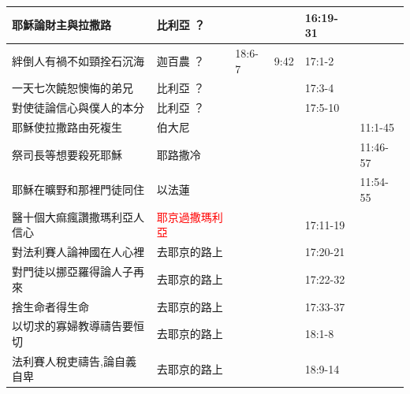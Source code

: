 \begin{table}[H]
\begin{tabular}{p{14em}|p{7.93em}|l|l|l|p{4.855em}}
耶穌論財主與拉撒路 & 比利亞 ？  &       &       & \multicolumn{1}{p{5.285em}|}{16:19-31} & \multicolumn{1}{l}{} \\ \midrule
絆倒人有禍不如頸拴石沉海& 迦百農 ？  &  \multicolumn{1}{p{5.285em}|}{18:6-7} & \multicolumn{1}{p{5.57em}|}{9:42}  & \multicolumn{1}{p{5.285em}|}{17:1-2} & \multicolumn{1}{l}{} \\\midrule

一天七次饒恕懊悔的弟兄& 比利亞 ？  &       &       & \multicolumn{1}{p{5.285em}|}{17:3-4} & \multicolumn{1}{l}{} \\\midrule

對使徒論信心與僕人的本分 & 比利亞 ？  &       &       & \multicolumn{1}{p{5.285em}|}{17:5-10} & \multicolumn{1}{l}{} \\\midrule

耶穌使拉撒路由死複生 & 伯大尼   &       &       &       & 11:1-45\\\midrule

祭司長等想要殺死耶穌& 耶路撒冷  &       &       &       & 11:46-57 \\\midrule
耶穌在曠野和那裡門徒同住&以法蓮&       &       &       & 11:54-55\\\midrule
醫十個大痲瘋讚撒瑪利亞人信心&\textcolor{red}{耶京過撒瑪利亞}&       &       & \multicolumn{1}{p{5.285em}|}{17:11-19} & \multicolumn{1}{l}{} \\ \midrule

對法利賽人論神國在人心裡&去耶京的路上&       &       & \multicolumn{1}{p{5.285em}|}{17:20-21} & \multicolumn{1}{l}{} \\ \midrule

對門徒以挪亞羅得論人子再來&去耶京的路上&       &       & \multicolumn{1}{p{5.285em}|}{17:22-32} & \multicolumn{1}{l}{} \\ \midrule

捨生命者得生命&去耶京的路上&       &       & \multicolumn{1}{p{5.285em}|}{17:33-37} & \multicolumn{1}{l}{} \\ \midrule


以切求的寡婦教導禱告要恒切&去耶京的路上&       &       & \multicolumn{1}{p{5.285em}|}{18:1-8} & \multicolumn{1}{l}{} \\ \midrule

法利賽人稅吏禱告,論自義自卑&去耶京的路上&       &       & \multicolumn{1}{p{5.285em}|}{18:9-14} & \multicolumn{1}{l}{} \\\midrule


\end{tabular}
\end{table}
